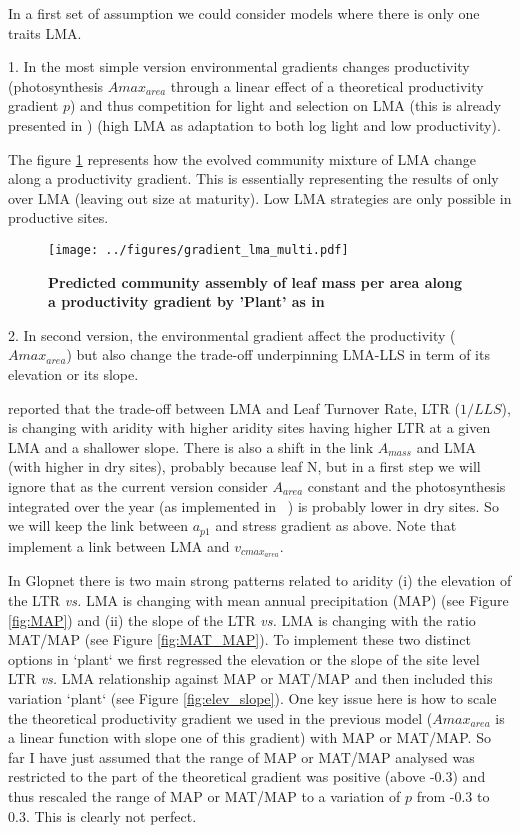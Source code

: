 \documentclass[a4paper,11pt]{article}
\begin{document}
In a first set of assumption we could consider models where there is only one traits LMA.

\clearpage

1. In the most simple version environmental gradients changes productivity (photosynthesis $A{max}_{area}$ through a linear effect of a theoretical productivity gradient $p$) and
thus competition for light and selection on LMA (this is already presented in \citet{Falster-2016}) (high LMA as adaptation to both log light and low productivity).

The figure \ref{fig:lma} represents how the evolved community mixture of LMA change along a productivity gradient. This is essentially representing the results of \citet{Falster-2016} only over LMA (leaving out size at maturity). Low LMA strategies are only possible in productive sites.

\begin{figure}[ht]
\centering
\texttt{[image: ../figures/gradient\_lma\_multi.pdf]}
\caption{\textbf{Predicted community assembly of leaf mass per area along a productivity gradient by 'Plant' as in \citep{Falster-2016}}
\label{fig:lma}}
\end{figure}

\clearpage

2. In second version, the environmental gradient affect the productivity ($A{max}_{area}$) but also change the trade-off underpinning LMA-LLS in term of its elevation or its slope.

\citet{Wright-2005} reported that the trade-off between LMA and Leaf Turnover Rate, LTR ($1/LLS$), is changing with aridity with higher aridity sites having higher LTR at a given LMA and a shallower slope. There is also a shift in the link $A_{mass}$ and LMA (with higher in dry sites), probably because leaf N, but in a first step we will ignore that as the current version consider $A_{area}$ constant and the photosynthesis integrated over the year (as implemented in \plant\ ) is probably lower in dry sites. So we will keep the link between $a_{p1}$ and stress gradient as above. Note that \citet{Sakschewski-2015} implement a link between LMA and $v_{cmax_{area}}$.

In Glopnet there is two main strong patterns related to aridity (i) the elevation of the LTR \textit{vs.} LMA is changing with mean annual precipitation (MAP) (see Figure \ref{fig:MAP}) and (ii) the slope of the LTR \textit{vs.} LMA is changing with the ratio MAT/MAP (see Figure \ref{fig:MAT_MAP}). To implement these two distinct options in `plant` we first regressed the elevation or the slope of the site level LTR \textit{vs.} LMA relationship against MAP or MAT/MAP and then included this variation `plant` (see Figure \ref{fig:elev_slope}). One key issue here is how to scale the theoretical productivity gradient we used in the previous model ($A{max}_{area}$ is a linear function with slope one of this gradient) with MAP or MAT/MAP. So far I have just assumed that the range of MAP or MAT/MAP analysed was restricted to the part of the theoretical gradient was positive (above -0.3) and thus rescaled the range of MAP or MAT/MAP to a variation of $p$ from -0.3 to 0.3. This is clearly not perfect.
\end{document}
